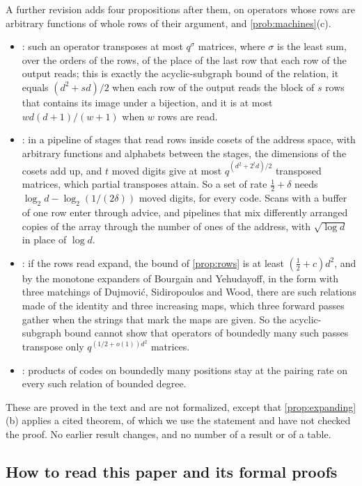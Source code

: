 A further revision adds four propositions after them, on operators whose rows are arbitrary functions of whole rows
of their argument, and \cref{prob:machines}(c).
\begin{itemize}[leftmargin=1.5em]
\item {}: such an operator transposes at most $q^{\sigma}$ matrices, where $\sigma$ is the least sum,
over the orders of the rows, of the place of the last row that each row of the output reads; this is exactly the
acyclic-subgraph bound of the relation, it equals $(d^2+sd)/2$ when each row of the output reads the block of $s$
rows that contains its image under a bijection, and it is at most $wd(d+1)/(w+1)$ when $w$ rows are read.
\item {}: in a pipeline of stages that read rows inside cosets of the address space, with arbitrary
functions and alphabets between the stages, the dimensions of the cosets add up, and $t$ moved digits give at most
$q^{(d^2+2^td)/2}$ transposed matrices, which partial transposes attain. So a set of rate $\tfrac12+\delta$ needs
$\log_2d-\log_2(1/(2\delta))$ moved digits, for every code. Scans with a buffer of one row enter through advice,
and pipelines that mix differently arranged copies of the array through the number of ones of the address, with
$\sqrt{\log d}$ in place of $\log d$.
\item {}: if the rows read expand, the bound of \cref{prop:rows} is at least
$(\tfrac12+c)d^2$, and by the monotone expanders of Bourgain and Yehudayoff, in the form with three matchings of
Dujmovi\'c, Sidiropoulos and Wood, there are such relations made of the identity and three increasing maps, which
three forward passes gather when the strings that mark the maps are given. So the acyclic-subgraph bound cannot show
that operators of boundedly many such passes transpose only $q^{(1/2+o(1))d^2}$ matrices.
\item {}: products of codes on boundedly many positions stay at the pairing rate on every such
relation of bounded degree.
\end{itemize}
These are proved in the text and are not formalized, except that \cref{prop:expanding}(b) applies a cited theorem,
of which we use the statement and have not checked the proof. No earlier result changes, and no number of a result
or of a table.

\subsection{How to read this paper and its formal proofs}

